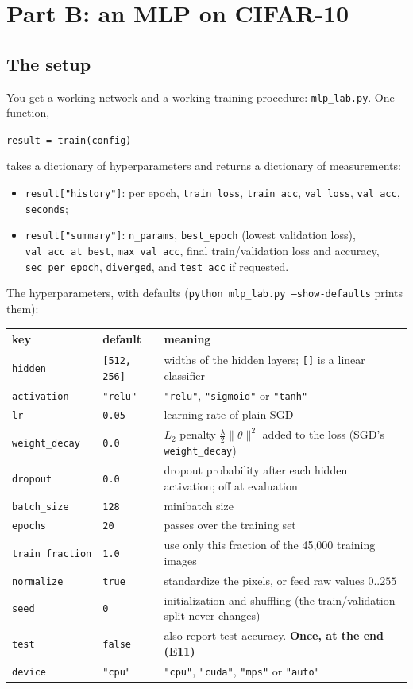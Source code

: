 \documentclass[11pt]{article}
\newcommand{\code}[1]{\texttt{#1}}
\begin{document}
\section*{Part B: an MLP on CIFAR-10}
\subsection*{The setup}
You get a working network and a working training procedure: \code{mlp\_lab.py}. One function,
\begin{center}\code{result = train(config)}\end{center}
takes a dictionary of hyperparameters and returns a dictionary of measurements:
\begin{itemize}
  \item \code{result["history"]}: per epoch, \code{train\_loss}, \code{train\_acc}, \code{val\_loss}, \code{val\_acc}, \code{seconds};
  \item \code{result["summary"]}: \code{n\_params}, \code{best\_epoch} (lowest validation loss), \code{val\_acc\_at\_best}, \code{max\_val\_acc}, final train/validation loss and accuracy, \code{sec\_per\_epoch}, \code{diverged}, and \code{test\_acc} if requested.
\end{itemize}
The hyperparameters, with defaults (\code{python mlp\_lab.py --show-defaults} prints them):
\begin{center}\small
\begin{tabular}{@{}lll@{}}
\toprule
key & default & meaning \\
\midrule
\code{hidden} & \code{[512, 256]} & widths of the hidden layers; \code{[]} is a linear classifier \\
\code{activation} & \code{"relu"} & \code{"relu"}, \code{"sigmoid"} or \code{"tanh"} \\
\code{lr} & \code{0.05} & learning rate of plain SGD \\
\code{weight\_decay} & \code{0.0} & $L_2$ penalty $\frac\lambda2\|\theta\|^2$ added to the loss (SGD's \code{weight\_decay}) \\
\code{dropout} & \code{0.0} & dropout probability after each hidden activation; off at evaluation \\
\code{batch\_size} & \code{128} & minibatch size \\
\code{epochs} & \code{20} & passes over the training set \\
\code{train\_fraction} & \code{1.0} & use only this fraction of the 45{,}000 training images \\
\code{normalize} & \code{true} & standardize the pixels, or feed raw values $0..255$ \\
\code{seed} & \code{0} & initialization and shuffling (the train/validation split never changes) \\
\code{test} & \code{false} & also report test accuracy. \textbf{Once, at the end (E11)} \\
\code{device} & \code{"cpu"} & \code{"cpu"}, \code{"cuda"}, \code{"mps"} or \code{"auto"} \\
\bottomrule
\end{tabular}
\end{center}
\end{document}
